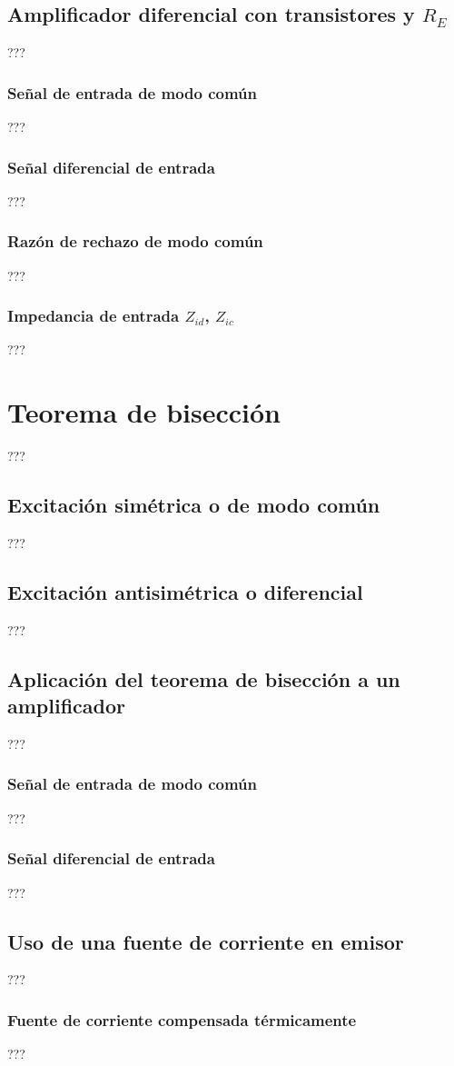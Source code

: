 \subsection{Amplificador diferencial con transistores y $R_E$}
???
\subsubsection{Señal de entrada de modo común}
???
\subsubsection{Señal diferencial de entrada}
???
\subsubsection{Razón de rechazo de modo común}
???
\subsubsection{Impedancia de entrada $Z_{id}$, $Z_{ic}$}
???
\section{Teorema de bisección}
???
\subsection{Excitación simétrica o de modo común}
???
\subsection{Excitación antisimétrica o diferencial}
???
\subsection{Aplicación del teorema de bisección a un amplificador}
???
\subsubsection{Señal de entrada de modo común}
???
\subsubsection{Señal diferencial de entrada}
???
\subsection{Uso de una fuente de corriente en emisor}
???
\subsubsection{Fuente de corriente compensada térmicamente}
???
